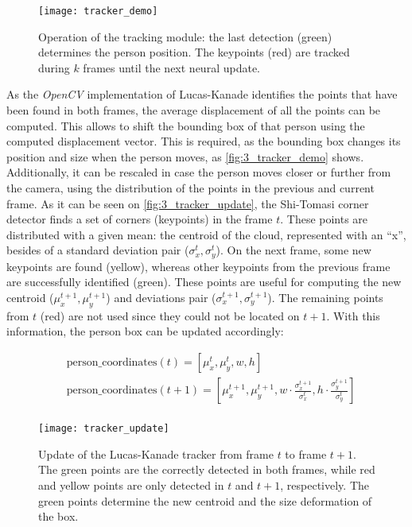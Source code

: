 \begin{figure}[h]
	\centering
	\texttt{[image: tracker\_demo]}
	\caption{Operation of the tracking module: the last detection (green) determines the person position. The keypoints (red) are tracked during $k$ frames until the next neural update.}
	\label{fig:3_tracker_demo}
\end{figure}

As the \textit{OpenCV} implementation of Lucas-Kanade identifies the points that have been found in both frames, the average displacement of all the points can be computed. This allows to shift the bounding box of that person using the computed displacement vector. This is required, as the bounding box changes its position and size when the person moves, as \autoref{fig:3_tracker_demo} shows. Additionally, it can be rescaled in case the person moves closer or further from the camera, using the distribution of the points in the previous and current frame. As it can be seen on \autoref{fig:3_tracker_update}, the Shi-Tomasi corner detector finds a set of corners (keypoints) in the frame $t$. These points are distributed with a given mean: the centroid of the cloud, represented with an ``x'', besides of a standard deviation pair ($\sigma_x^t, \sigma_y^t$). On the next frame, some new keypoints are found (yellow), whereas other keypoints from the previous frame are successfully identified (green). These points are useful for computing the new centroid ($\mu_x^{t+1}, \mu_y^{t+1}$) and deviations pair ($\sigma_x^{t+1}, \sigma_y^{t+1}$). The remaining points from $t$ (red) are not used since they could not be located on $t+1$. With this information, the person box can be updated accordingly:

\begin{align*}
&\text{person\_coordinates}(t) = \left[\mu_x^{t}, \mu_y^{t}, w, h\right]\\
&\text{person\_coordinates}(t+1) = \left[\mu_x^{t+1}, \mu_y^{t+1}, w\cdot\frac{\sigma_x^{t+1}}{\sigma_x^t}, h\cdot\frac{\sigma_y^{t+1}}{\sigma_y^t}\right]\\
\end{align*}

\begin{figure}[h]
	\centering
	\texttt{[image: tracker\_update]}
	\caption{Update of the Lucas-Kanade tracker from frame $t$ to frame $t+1$. The green points are the correctly detected in both frames, while red and yellow points are only detected in $t$ and $t+1$, respectively. The green points determine the new centroid and the size deformation of the box.}
	\label{fig:3_tracker_update}
\end{figure}

